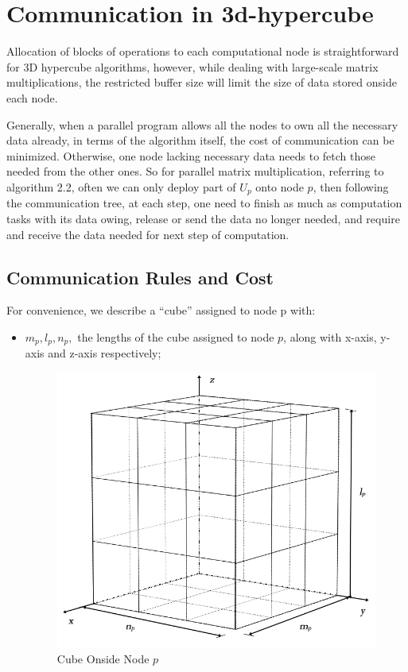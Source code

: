 \documentclass{amsart}
\theoremstyle{definition}
\theoremstyle{remark}
\numberwithin{equation}{section}
\begin{document}
\section{Communication in 3d-hypercube}
	Allocation of blocks of operations to each computational node is straightforward for 3D hypercube algorithms, however, while dealing with large-scale matrix multiplications, the restricted buffer size will limit the size of data stored onside each node.\par
	Generally, when a parallel program allows all the nodes to own all the necessary data already, in terms of the algorithm itself, the cost of communication can be minimized. Otherwise, one node lacking necessary data needs to fetch those needed from the other ones. So for parallel matrix multiplication, referring to algorithm 2.2, often we can only deploy part of $U_p$ onto node $p$, then following the communication tree, at each step, one need to finish as much as computation tasks with its data owing, release or send the data no longer needed, and require and receive the data needed for next step of computation.\par


\subsection{Communication Rules and Cost}
For convenience, we describe a “cube” assigned to node p with:\par
\begin{itemize}
\item $m_p,l_p,n_p,$ the lengths of the cube assigned to node $p$, along with x-axis, y-axis and z-axis respectively;
\begin{figure}[tb]
	\includegraphics[scale=0.3]{Figures/cube.jpg}
	\caption{Cube Onside Node $p$}
\end{figure}
\end{itemize}
\end{document}
